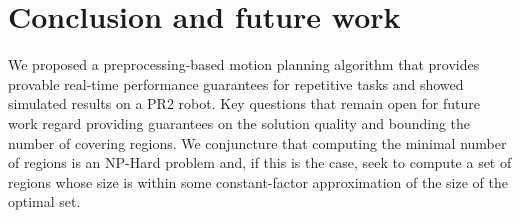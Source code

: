 \documentclass[letterpaper]{article} %
\begin{document}
\section{Conclusion and future work}
We proposed a preprocessing-based motion planning algorithm that provides provable real-time performance guarantees for repetitive tasks and showed simulated results on a PR2 robot. 
Key questions that remain open for future work regard providing guarantees on the solution quality and bounding the number of covering regions.
We conjuncture that computing the minimal number of regions is an \textsf{NP-Hard} problem and, if this is the case, seek to compute a set of regions whose size is within some constant-factor approximation of  the size of the optimal set.


\end{document}
